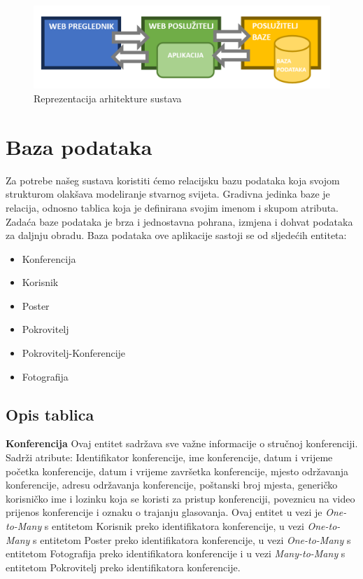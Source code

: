 \begin{figure} [hbt!]
	\includegraphics[width=\linewidth]{Slike/ArhitekturaSustava}
	\caption{Reprezentacija arhitekture sustava}
\end{figure}

		\clearpage

		\section{Baza podataka}
			
		Za potrebe našeg sustava koristiti ćemo relacijsku bazu podataka koja svojom strukturom olakšava modeliranje stvarnog svijeta. Gradivna jedinka baze je relacija, odnosno tablica koja je definirana svojim imenom i skupom atributa. Zadaća baze podataka je brza i jednostavna pohrana, izmjena i dohvat podataka za daljnju obradu.
		Baza podataka ove aplikacije sastoji se od sljedećih entiteta: 
		
		\begin{itemize}
			\item Konferencija
			\item Korisnik
			\item Poster
			\item Pokrovitelj
			\item Pokrovitelj-Konferencije
			\item Fotografija
		\end{itemize}
		
		\clearpage
		
		\subsection{Opis tablica}
	
	\noindent\textbf{Konferencija } Ovaj entitet sadržava sve važne informacije o stručnoj konferenciji. Sadrži atribute: Identifikator konferencije, ime konferencije, datum i vrijeme početka konferencije, datum i vrijeme završetka konferencije, mjesto održavanja konferencije, adresu održavanja konferencije, poštanski broj mjesta, generičko korisničko ime i lozinku koja se koristi za pristup konferenciji, poveznicu na video prijenos konferencije i oznaku o trajanju glasovanja. Ovaj entitet u vezi je \textit{One-to-Many} s entitetom Korisnik preko identifikatora konferencije, u vezi \textit{One-to-Many} s entitetom Poster preko identifikatora konferencije, u vezi \textit{One-to-Many} s entitetom Fotografija preko identifikatora konferencije i u vezi \textit{Many-to-Many} s entitetom Pokrovitelj preko identifikatora konferencije. 
	
